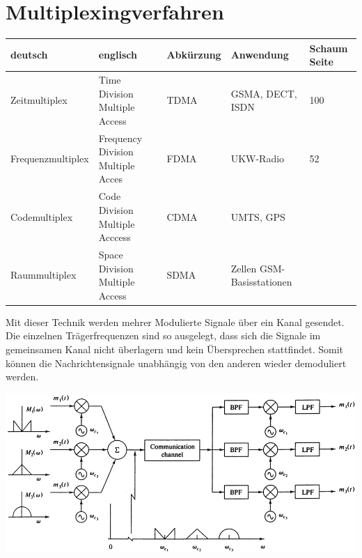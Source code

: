 \section{Multiplexingverfahren} \label{multiplex}
\begin{tabular}{|l|l|l|l|l|}
\hline
\textbf{deutsch} & \textbf{englisch} &
\textbf{Abkürzung} & \textbf{Anwendung} &
\textbf{Schaum Seite} \\
\hline
Zeitmultiplex & Time Division Multiple Access & TDMA & GSMA, DECT, ISDN & 100 \\
\hline
Frequenzmultiplex & Frequency Division Multiple Acces & FDMA & UKW-Radio & 52 \\
\hline
Codemultiplex & Code Division Multiple Acccess & CDMA & UMTS, GPS & \\
\hline
Raummultiplex & Space Division Multiple Access & SDMA & Zellen
GSM-Basisstationen & \\
\hline
\end{tabular}

Mit dieser Technik werden mehrer Modulierte Signale über ein Kanal gesendet. Die einzelnen
Trägerfrequenzen sind so ausgelegt, dass sich die Signale im gemeinsamen Kanal nicht überlagern und
kein Übersprechen stattfindet. Somit können die Nachrichtensignale unabhängig von den anderen
wieder demoduliert werden.
\begin{center}
    \includegraphics[width=14cm]{bilder/multiplex_fdm_blockdiagramm.png}
\end{center}

